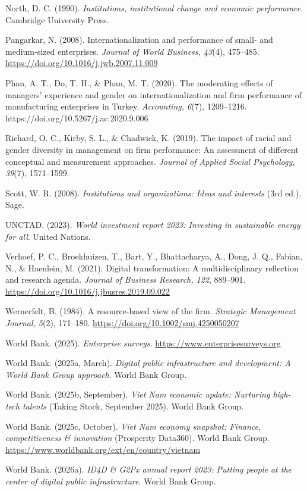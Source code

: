 \documentclass[
  12pt]{article}
\begin{document}
North, D. C. (1990). \emph{Institutions, institutional change and
economic performance}. Cambridge University Press.

Pangarkar, N. (2008). Internationalization and performance of small- and
medium-sized enterprises. \emph{Journal of World Business, 43}(4),
475--485. \url{https://doi.org/10.1016/j.jwb.2007.11.009}

Phan, A. T., Do, T. H., \& Phan, M. T. (2020). The moderating effects of
managers' experience and gender on internationalization and firm
performance of manufacturing enterprises in Turkey. \emph{Accounting,
6}(7), 1209--1216. https://doi.org/10.5267/j.ac.2020.9.006

Richard, O. C., Kirby, S. L., \& Chadwick, K. (2019). The impact of
racial and gender diversity in management on firm performance: An
assessment of different conceptual and measurement approaches.
\emph{Journal of Applied Social Psychology, 39}(7), 1571--1599.

Scott, W. R. (2008). \emph{Institutions and organizations: Ideas and
interests} (3rd ed.). Sage.

UNCTAD. (2023). \emph{World investment report 2023: Investing in
sustainable energy for all}. United Nations.

Verhoef, P. C., Broekhuizen, T., Bart, Y., Bhattacharya, A., Dong, J.
Q., Fabian, N., \& Haenlein, M. (2021). Digital transformation: A
multidisciplinary reflection and research agenda. \emph{Journal of
Business Research, 122}, 889--901.
\url{https://doi.org/10.1016/j.jbusres.2019.09.022}

Wernerfelt, B. (1984). A resource-based view of the firm.
\emph{Strategic Management Journal, 5}(2), 171--180.
\url{https://doi.org/10.1002/smj.4250050207}

World Bank. (2025). \emph{Enterprise surveys}.
\url{https://www.enterprisesurveys.org}

World Bank. (2025a, March). \emph{Digital public infrastructure and
development: A World Bank Group approach}. World Bank Group.

World Bank. (2025b, September). \emph{Viet Nam economic update:
Nurturing high-tech talents} (Taking Stock, September 2025). World Bank
Group.

World Bank. (2025c, October). \emph{Viet Nam economy snapshot: Finance,
competitiveness \& innovation} (Prosperity Data360). World Bank Group.
\url{https://www.worldbank.org/ext/en/country/vietnam}

World Bank. (2026a). \emph{ID4D \& G2Px annual report 2023: Putting
people at the center of digital public infrastructure}. World Bank
Group.
\end{document}
